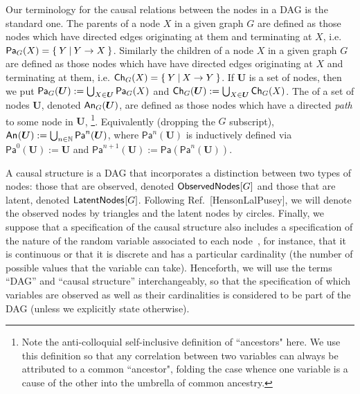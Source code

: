 Our terminology for the causal relations between the nodes in a DAG is the standard one. The parents of a node $X$ in a given graph $G$ are defined as those nodes which have directed edges originating at them and terminating at $X$, i.e. $\Pa[G]{X} = \{\:Y\:|\:Y\to X\:\}$.  Similarly the children of a node $X$ in a given graph $G$ are defined as those nodes which have have directed edges originating at $X$ and terminating at them, i.e. $\Ch[G]{X} = \{\:Y\:|\: X\to Y\:\}$. If $\bm{U}$ is a set of nodes, then we put $\Pa[G]{\bm{U}} := \bigcup_{X\in\bm{U}} \Pa[G]{X}$ and $\Ch[G]{\bm{U}} := \bigcup_{X\in\bm{U}} \Ch[G]{X}$.  The  of a set of nodes $\bm{U}$, denoted $\An[G]{\bm{U}}$, are defined as those nodes which have a directed \emph{path} to some node in $\bm{U}$, \footnote{Note the anti-colloquial self-inclusive definition of ``ancestors" here. We use this definition so that any correlation between two variables can always be attributed to a common ``ancestor", folding the case whence one variable is a cause of the other into the umbrella of common ancestry.}. %
Equivalently (dropping the $G$ subscript), $\An{\bm{U}} := \bigcup_{n\in\mathbb{N}} \mathsf{Pa}^n(\bm{U})$, where $\mathsf{Pa}^n(\bm{U})$ is inductively defined via $\mathsf{Pa}^0(\bm{U}) := \bm{U}$ and $\mathsf{Pa}^{n+1}(\bm{U}) := \mathsf{Pa}(\mathsf{Pa}^n(\bm{U}))$. 

A causal structure is a DAG that incorporates a distinction between two types of nodes: those that are observed, denoted $\SmallNamedFunction{ObservedNodes}{G}$ and those that are latent, denoted $\SmallNamedFunction{LatentNodes}{G}$.  %
Following Ref.~[HensonLalPusey], we will denote the observed nodes by triangles and the latent nodes by circles.
Finally, we suppose that a specification of the causal structure also includes a specification of the nature of the random variable associated to each node~\cite[Appendix A]{BeyondBellII}, for instance, that it is continuous or that it is discrete and has a particular cardinality (the number of possible values that the variable can take).  Henceforth, we will use the terms ``DAG'' and ``causal structure'' interchangeably, so that the specification of which variables are observed as well as their cardinalities is considered to be part of the DAG (unless we explicitly state otherwise).

